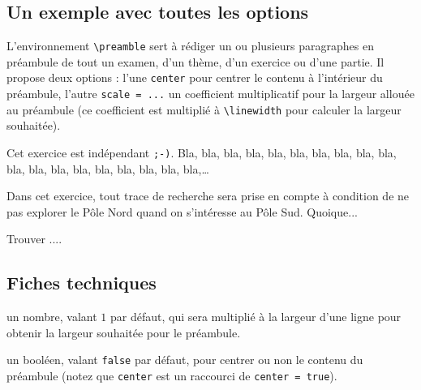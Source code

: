 \documentclass[12pt,a4paper]{scrartcl}
\newenvironment{preamble}[1][]{}{}
\begin{document}
    \subsection{Un exemple avec toutes les options}

L'environnement \verb+\preamble+ sert à rédiger un ou plusieurs paragraphes en préambule de tout un examen, d'un thème, d'un exercice ou d'une partie.
Il propose deux options : l'une \verb+center+ pour centrer le contenu à l'intérieur du préambule, l'autre \verb+scale = ...+ un coefficient multiplicatif pour la largeur allouée au préambule (ce coefficient est multiplié à \verb+\linewidth+ pour calculer la largeur souhaitée).

\resetallcnt{}

\begin{tcblisting}{}
\begin{preamble}[scale = 0.75, center]
    Cet exercice est indépendant \verb+;-)+. Bla, bla, bla, bla, bla, bla,
    bla, bla, bla, bla, bla, bla, bla, bla, bla, bla, bla, bla, bla,\dots
\end{preamble}

\exercise

\begin{preamble}
    Dans cet exercice, tout trace de recherche sera prise en compte à
    condition de ne pas explorer le Pôle Nord quand on s'intéresse
    au Pôle Sud. Quoique...
\end{preamble}

Trouver ....
\end{tcblisting}


    \subsection{Fiches techniques}


 un nombre, valant $1$ par défaut, qui sera multiplié à la largeur d'une ligne pour obtenir la largeur souhaitée pour le préambule.

 un booléen, valant \verb+false+ par défaut, pour centrer ou non le contenu du préambule (notez que \verb+center+ est un raccourci de \verb+center = true+).
\end{document}
